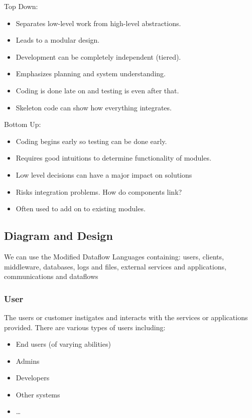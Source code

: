 \begin{minipage}[t]{0.45\linewidth}
	Top Down:
	\begin{itemize}
		\item Separates low-level work from high-level abstractions.
		\item Leads to a modular design.
		\item Development can be completely independent (tiered).
		\item Emphasizes planning and system understanding.
		\item Coding is done late on and testing is even after that.
		\item Skeleton code can show how everything integrates.
	\end{itemize}
\end{minipage}
\hfill
\begin{minipage}[t]{0.45\linewidth}
	Bottom Up:
	\begin{itemize}
		\item Coding begins early so testing can be done early.
		\item Requires good intuitions to determine functionality of modules.
		\item Low level decisions can have a major impact on solutions
		\item Risks integration problems. How do components link?
		\item Often used to add on to existing modules.
	\end{itemize}
\end{minipage}

\subsection{Diagram and Design}\label{sub:diagram_and_design}

We can use the Modified Dataflow Languages containing: users, clients, middleware, databases, logs and files, external services and applications, communications and dataflows

\subsubsection{User}\label{ssub:user}

The users or customer instigates and interacts with the services or applications provided.
There are various types of users including:
\begin{itemize}
	\item End users (of varying abilities)
	\item Admins
	\item Developers
	\item Other systems
	\item \dots
\end{itemize}

